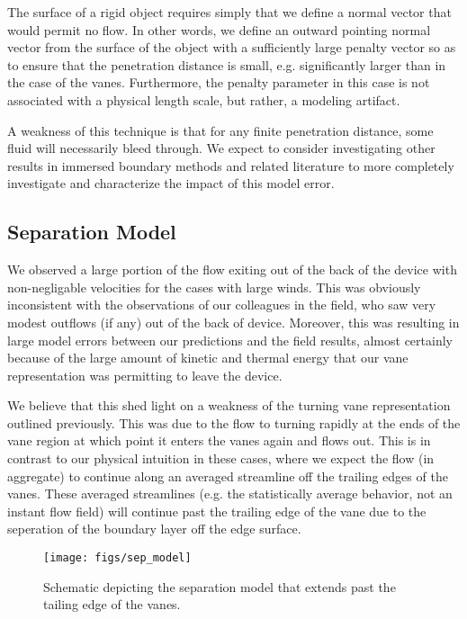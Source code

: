 The surface of a rigid object requires simply that we
define a normal vector that would permit no flow. In other words, we
define an outward pointing normal vector from the surface of the object
with a sufficiently large penalty vector so as to ensure that the
penetration distance is small, e.g. significantly larger than in the
case of the vanes. Furthermore, the penalty parameter in this case is
not associated with a physical length scale, but rather, a modeling
artifact. 


A weakness of this technique is that for
any finite penetration distance, some fluid will necessarily bleed
through. We expect to consider investigating other results in 
immersed boundary methods and related literature to more completely
investigate and characterize the impact of this model error.  


\subsection{Separation Model}

We observed a large portion of the flow exiting out of the back of 
the device with non-negligable velocities for the cases with large winds. 
This was obviously inconsistent with the observations of our colleagues 
in the field, who saw very modest outflows (if any) out of the back of device. 
Moreover, this was resulting in large model errors between our predictions and the 
field results, almost certainly because of the large amount of kinetic and thermal 
energy that our vane representation was permitting to leave the device. 

We believe that this shed light on a weakness of the turning vane representation 
outlined previously. This was due to the flow to turning rapidly at the ends of the vane
region at which point it enters the vanes again and flows out. This is in contrast to our 
physical intuition in these cases, where we expect the flow (in aggregate) to continue along an 
averaged streamline off the trailing edges of the vanes. These averaged streamlines 
(e.g. the statistically average behavior, not an instant flow field) will continue 
past the trailing edge of the vane due to the seperation of the boundary layer off the edge surface.


\begin{figure}[!htb]
  \begin{center}
    \texttt{[image: figs/sep\_model]}
    \caption{Schematic depicting the separation model that extends past the tailing edge of the vanes.}
    \label{fig:sep_model}
  \end{center}
\end{figure}

